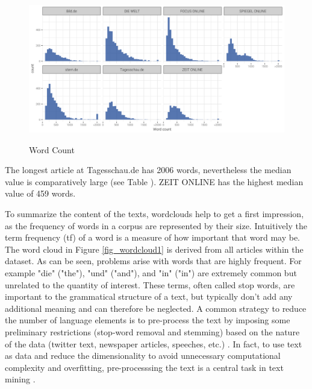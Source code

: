 \documentclass[12pt,a4paper,notitlepage]{article}
\begin{document}
\begin{figure}[H]
	\caption{Word Count}
	\begin{center}
		\includegraphics[width=\textwidth]{../figs/wordcount.png}
		\label{fig_wordcount}
	\end{center}
\end{figure}

The longest article at Tagesschau.de has 2006 words, nevertheless the median value is comparatively large (see Table \label{t_wordcount}). ZEIT ONLINE has the highest median value of 459 words. 



To summarize the content of the texts, wordclouds help to get a first impression, as the frequency of words in a corpus are represented by their size. Intuitively the term frequency (tf) of a word is a measure of how important that word may be. The word cloud in Figure \ref{fig_wordcloud1} is derived from all articles within the dataset. As can be seen, problems arise with words that are highly frequent. For example "die" ("the"), "und" ("and"), and "in" ("in") are extremely common but unrelated to the quantity of interest. These terms, often called stop words, are important to the grammatical structure of a text, but typically don't add any additional meaning and can therefore be neglected. A common strategy to reduce the number of language elements is to pre-process the text by imposing some preliminary restrictions (stop-word removal and stemming) based on the nature of the data (twitter text, newspaper articles, speeches, etc.) \citep{gentzkow_text_2017}. In fact, to use text as data and reduce the dimensionality to avoid unnecessary computational complexity and overfitting, pre-processsing the text is a central task in text mining \citep{bholat_text_2015}.  
\end{document}
